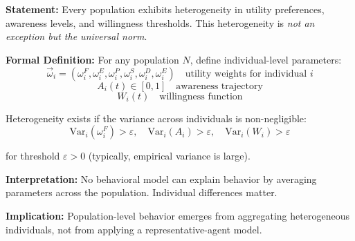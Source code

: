 \begin{tcolorbox}[colback=gray!5!white, colframe=gray!75!black,
    title=Axiom SEG-EMERGE-1: Universal Population Heterogeneity]

\textbf{Statement:}
Every population exhibits heterogeneity in utility preferences, awareness levels,
and willingness thresholds. This heterogeneity is \textit{not an exception but
the universal norm}.

\textbf{Formal Definition:}
For any population $N$, define individual-level parameters:
\begin{equation}
\vec{\omega}_i = (\omega^F_i, \omega^E_i, \omega^P_i, \omega^S_i, \omega^D_i, \omega^E_i)
\quad \text{utility weights for individual } i
\end{equation}
\begin{equation}
A_i(t) \in [0,1] \quad \text{awareness trajectory}
\end{equation}
\begin{equation}
W_i(t) \quad \text{willingness function}
\end{equation}

Heterogeneity exists if the variance across individuals is non-negligible:
\begin{equation}
\text{Var}_i(\omega^F_i) > \varepsilon, \quad \text{Var}_i(A_i) > \varepsilon, \quad
\text{Var}_i(W_i) > \varepsilon
\end{equation}

for threshold $\varepsilon > 0$ (typically, empirical variance is large).

\textbf{Interpretation:}
No behavioral model can explain behavior by averaging parameters across the
population. Individual differences matter.

\textbf{Implication:}
Population-level behavior emerges from aggregating heterogeneous individuals,
not from applying a representative-agent model.

\end{tcolorbox}

\vspace{1em}

